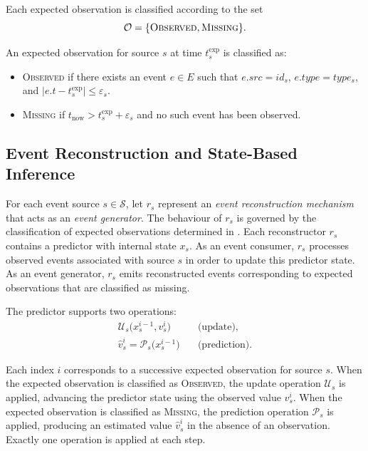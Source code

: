 Each expected observation is classified according to the set
\begin{equation}
\mathcal{O} = \{\textsc{Observed}, \textsc{Missing}\}.
\end{equation}

An expected observation for source $s$ at time $t^{\mathrm{exp}}_s$ is classified as:
\begin{itemize}
    \item \textsc{Observed} if there exists an event $e \in E$ such that $e.src = id_s$, $e.type = type_s$, and $\lvert e.t - t^{\mathrm{exp}}_s \rvert \le \varepsilon_s$.
    \item \textsc{Missing} if $t_{\mathrm{now}} > t^{\mathrm{exp}}_s + \varepsilon_s$ and no such event has been observed.
\end{itemize}
\noindent




\subsection{Event Reconstruction and State-Based Inference}
\label{sec:state-based-inference}

For each event source $s \in \mathcal{S}$, let $r_s$ represent an \emph{event reconstruction mechanism} that acts as an \emph{event generator}. The behaviour of $r_s$ is governed by the classification of expected observations determined in .
Each reconstructor $r_s$ contains a predictor with internal state $x_s$. As an event consumer, $r_s$ processes observed events associated with source $s$ in order to update this predictor state. As an event generator, $r_s$ emits reconstructed events corresponding to expected observations that are classified as missing.

The predictor supports two operations:
\begin{align}
\mathcal{U}_s\bigl(x_s^{i-1}, v_s^{i}\bigr)
&\quad\text{(update)}, \\
\hat{v}_s^{i} = \mathcal{P}_s\bigl(x_s^{i-1}\bigr)
&\quad\text{(prediction)}.
\end{align}

Each index $i$ corresponds to a successive expected observation for source $s$. When the expected observation is classified as \textsc{Observed}, the update operation $\mathcal{U}_s$ is applied, advancing the predictor state using the observed value $v_s^{i}$. When the expected observation is classified as \textsc{Missing}, the prediction operation $\mathcal{P}_s$ is applied, producing an estimated value $\hat{v}_s^{i}$ in the absence of an observation. Exactly one operation is applied at each step.


